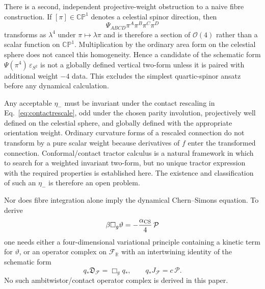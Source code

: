 \documentclass[aps,prd,reprint,nofootinbib,superscriptaddress]{revtex4-2}
\theoremstyle{definition}
\theoremstyle{remark}
\newcommand{\CP}{\mathbb{CP}}
\begin{document}
There is a second, independent projective-weight obstruction to a naive fibre construction.  If $[\pi]\in\CP^1$ denotes a celestial spinor direction, then
\begin{equation}
 \Psi_{ABCD}\pi^A\pi^B\pi^C\pi^D
 \label{eq:O4WeylSection}
\end{equation}
transforms as $\lambda^4$ under $\pi\mapsto\lambda\pi$ and is therefore a section of $\mathcal O(4)$ rather than a scalar function on $\CP^1$.  Multiplication by the ordinary area form on the celestial sphere does not cancel this homogeneity.  Hence a candidate of the schematic form $\Psi(\pi^4)\,\varepsilon_{S^2}$ is not a globally defined vertical two-form unless it is paired with additional weight $-4$ data.  This excludes the simplest quartic-spinor ansatz before any dynamical calculation.

Any acceptable $\eta_-$ must be invariant under the contact rescaling in Eq.~\eqref{eq:contactrescale}, odd under the chosen parity involution, projectively well defined on the celestial sphere, and globally defined with the appropriate orientation weight. Ordinary curvature forms of a rescaled connection do not transform by a pure scalar weight because derivatives of $f$ enter the transformed connection. Conformal/contact tractor calculus is a natural framework in which to search for a weighted invariant two-form, but no unique tractor expression with the required properties is established here. The existence and classification of such an $\eta_-$ is therefore an open problem.

Nor does fibre integration alone imply the dynamical Chern--Simons equation. To derive
\begin{equation}
 \beta\Box_g\vartheta=-\frac{\alpha_{\rm CS}}{4}\,\mathcal P
 \label{eq:dCSequationResearch}
\end{equation}
one needs either a four-dimensional variational principle containing a kinetic term for $\vartheta$, or an operator complex on $\mathcal F_{\mathbb R}$ with an intertwining identity of the schematic form
\begin{equation}
 q_*\mathfrak D_{\mathcal F}=\Box_g q_*,
 \qquad
 q_*J_{\mathcal F}=c\,\mathcal P.
 \label{eq:IntertwiningProgram}
\end{equation}
No such ambitwistor/contact operator complex is derived in this paper.
\end{document}
